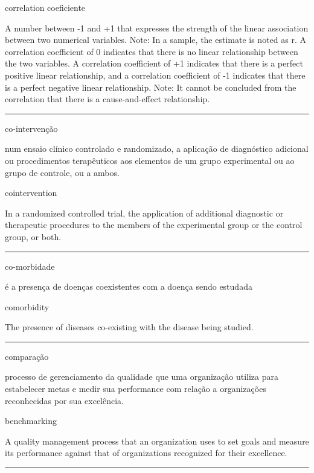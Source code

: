 \documentclass[
]{book}
\begin{document}
correlation coeficiente

A number between -1 and +1 that expresses the strength of the linear association between two numerical variables. Note: In a sample, the estimate is noted as r. A correlation coefficient of 0 indicates that there is no linear relationship between the two variables. A correlation coefficient of +1 indicates that there is a perfect positive linear relationship, and a correlation coefficient of -1 indicates that there is a perfect negative linear relationship. Note: It cannot be concluded from the correlation that there is a cause-and-effect relationship.

\begin{center}\rule{0.5\linewidth}{0.5pt}\end{center}

co-intervenção

num ensaio clínico controlado e randomizado, a aplicação de diagnóstico adicional ou procedimentos terapêuticos aos elementos de um grupo experimental ou ao grupo de controle, ou a ambos.

cointervention

In a randomized controlled trial, the application of additional diagnostic or therapeutic procedures to the members of the experimental group or the control group, or both.

\begin{center}\rule{0.5\linewidth}{0.5pt}\end{center}

co-morbidade

é a presença de doenças coexistentes com a doença sendo estudada

comorbidity

The presence of diseases co-existing with the disease being studied.

\begin{center}\rule{0.5\linewidth}{0.5pt}\end{center}

comparação

processo de gerenciamento da qualidade que uma organização utiliza para estabelecer metas e medir sua performance com relação a organizações reconhecidas por sua excelência.

benchmarking

A quality management process that an organization uses to set goals and measure its performance against that of organizations recognized for their excellence.

\begin{center}\rule{0.5\linewidth}{0.5pt}\end{center}
\end{document}

